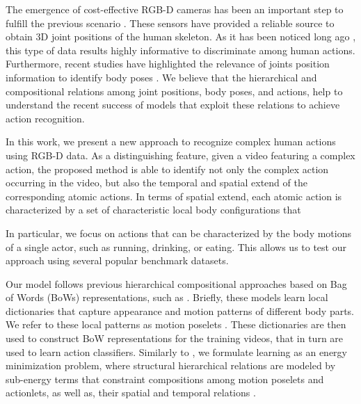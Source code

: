 The emergence of cost-effective RGB-D cameras has been an important step to 
fulfill the previous scenario \cite{Shotton:EtAl:11}. These sensors have 
provided a reliable source to obtain 3D joint positions of the human skeleton. 
As it has been noticed long ago \cite{Johansson:1973}, this type of data results 
highly informative to discriminate among human actions. Furthermore, recent 
studies have highlighted the relevance of joints position information to 
identify body poses \cite{Jhuang:EtAl:2013,Wang:EtAl:2013}. We believe that the 
hierarchical and compositional relations among joint positions, body poses, and 
actions, help to understand the recent success of models that exploit these 
relations to achieve action recognition.

In this work, we present a new approach to recognize
complex human actions using RGB-D data. As a distinguishing feature,
given a video featuring a complex action, the
proposed method is able to identify not only the complex action occurring in the
video, but also the temporal and spatial extend of the corresponding atomic
actions. In terms of spatial extend, each atomic action is characterized by a 
set of characteristic local body configurations that 

In particular, we focus on actions that can be characterized by the
body motions of a single actor, such as running, drinking, or eating. This
allows us to test our approach using several popular benchmark datasets.

Our model follows previous hierarchical compositional approaches based on Bag
of Words (BoWs) representations, such as \cite{Wang2013, 
Lillo2014,Taralova:EtAl:2014,Tao2015}.
Briefly, these models learn local dictionaries that capture
appearance and motion patterns of different body parts. We refer to these local 
patterns as motion poselets \cite{Bourdev:EtAl:2010, Tao2015}. These
dictionaries are then used to construct BoW representations for the training
videos, that in turn are used to learn action classifiers. Similarly to
\cite{Lillo2014, Tao2015}, we formulate learning as an energy minimization
problem, where structural hierarchical relations are modeled by sub-energy
terms that constraint compositions among
motion poselets and actionlets, as well as, their spatial and 
temporal relations
\cite{Lillo2014}.

